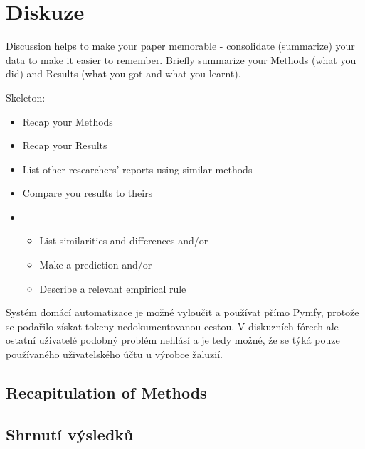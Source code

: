 \chapter{Diskuze} \label{chap:discussion}
Discussion helps to make your paper memorable - consolidate (summarize) your data to make it easier to remember. Briefly summarize your Methods (what you did) and Results (what you got and what you learnt).

Skeleton:
\begin{itemize}
    \item Recap your Methods
    \item Recap your Results
    \item List other researchers’ reports using similar methods
    \item Compare you results to theirs
    \item \begin{itemize}
        \item List similarities and differences and/or
        \item Make a prediction and/or
        \item Describe a relevant empirical rule
    \end{itemize}
\end{itemize}

Systém domácí automatizace je možné vyloučit a používat přímo Pymfy, protože se podařilo získat tokeny nedokumentovanou cestou. V diskuzních fórech ale ostatní uživatelé podobný problém nehlásí a je tedy možné, že se týká pouze používaného uživatelského účtu u výrobce žaluzií. 


\section{Recapitulation of Methods} \label{sec:recapitulation_of_methods}

\section{Shrnutí výsledků} \label{sec:summary_of_results}
